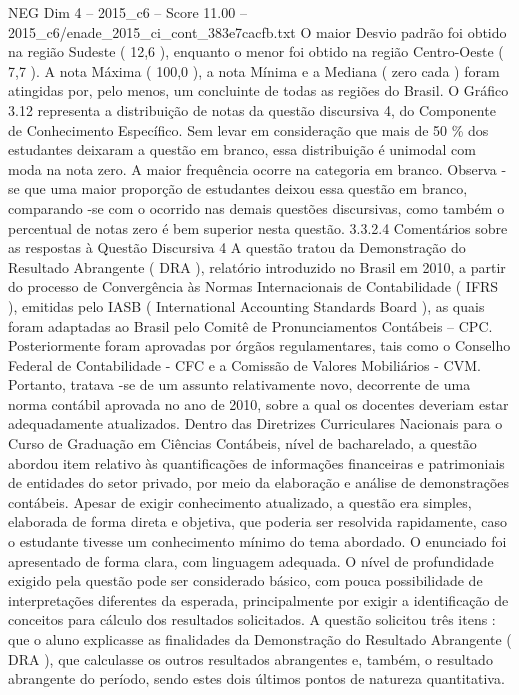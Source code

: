 \begin{textsample}{NEG Dim 4 – 2015\_c6 – Score 11.00 – 2015\_c6/enade\_2015\_ci\_cont\_383e7cacfb.txt}
O maior Desvio padrão foi obtido na região Sudeste ( 12,6 ), enquanto o menor foi obtido na região Centro-Oeste ( 7,7 ).
A nota Máxima ( 100,0 ), a nota Mínima e a Mediana ( zero cada ) foram atingidas por, pelo menos, um concluinte de todas as regiões do Brasil.
O Gráfico 3.12 representa a distribuição de notas da questão discursiva 4, do Componente de Conhecimento Específico.
Sem levar em consideração que mais de 50 \% dos estudantes deixaram a questão em branco, essa distribuição é unimodal com moda na nota zero.
A maior frequência ocorre na categoria em branco.
Observa -se que uma maior proporção de estudantes deixou essa questão em branco, comparando -se com o ocorrido nas demais questões discursivas, como também o percentual de notas zero é bem superior nesta questão. 3.3.2.4 Comentários sobre as respostas à Questão Discursiva 4 A questão tratou da Demonstração do Resultado Abrangente ( DRA ), relatório introduzido no Brasil em 2010, a partir do processo de Convergência às Normas Internacionais de Contabilidade ( IFRS ), emitidas pelo IASB ( International Accounting Standards Board ), as quais foram adaptadas ao Brasil pelo Comitê de Pronunciamentos Contábeis – CPC.
Posteriormente foram aprovadas por órgãos regulamentares, tais como o Conselho Federal de Contabilidade - CFC e a Comissão de Valores Mobiliários - CVM.
Portanto, tratava -se de um assunto relativamente novo, decorrente de uma norma contábil aprovada no ano de 2010, sobre a qual os docentes deveriam estar adequadamente atualizados.
Dentro das Diretrizes Curriculares Nacionais para o Curso de Graduação em Ciências Contábeis, nível de bacharelado, a questão abordou item relativo às quantificações de informações financeiras e patrimoniais de entidades do setor privado, por meio da elaboração e análise de demonstrações contábeis.
Apesar de exigir conhecimento atualizado, a questão era simples, elaborada de forma direta e objetiva, que poderia ser resolvida rapidamente, caso o estudante tivesse um conhecimento mínimo do tema abordado.
O enunciado foi apresentado de forma clara, com linguagem adequada.
O nível de profundidade exigido pela questão pode ser considerado básico, com pouca possibilidade de interpretações diferentes da esperada, principalmente por exigir a identificação de conceitos para cálculo dos resultados solicitados.
A questão solicitou três itens : que o aluno explicasse as finalidades da Demonstração do Resultado Abrangente ( DRA ), que calculasse os outros resultados abrangentes e, também, o resultado abrangente do período, sendo estes dois últimos pontos de natureza quantitativa.

\end{textsample}
